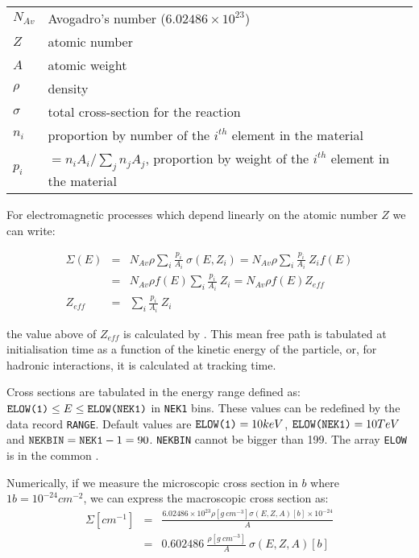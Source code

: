 \begin{tabular}[t]{ll}
$N_{Av}$         & Avogadro's number ($6.02486 \times 10^{23}$) \\
$Z$         & atomic number  \\
$A$         & atomic weight  \\
$\rho$    & density \\
$\sigma$  & total cross-section for the reaction \\
$n_i$   & \parbox[t]{14cm}{proportion by number of the $i^{th}$  
element in the material} \\
$p_i$ & \parbox[t]{14cm}{$=n_{i} A_{i}/ \sum_j n_jA_j$, proportion by 
weight of the $i^{th}$ element in the material}
\end{tabular}
 
For electromagnetic processes which depend linearly on the atomic number 
$Z$ we can write:

\begin{eqnarray*}
\Sigma(E)  & =  & N_{Av} \rho \sum_i \frac{p_i}{A_i}\: \sigma(E,Z_i) =
N_{Av} \rho \sum_i \frac{p_i}{A_i}\: Z_i f(E) \\
& = & N_{Av} \rho f(E) \sum_i \frac{p_i}{A_i}\: Z_i = N_{Av} \rho f(E) Z_{eff} \\
Z_{eff} & = & \sum_i \frac{p_i}{A_i}\: Z_i 
\end{eqnarray*}

the value above of $Z_{eff}$ is calculated by .
This mean free path is tabulated at initialisation time as a function
of the kinetic energy of the particle, or, for hadronic interactions,
it is calculated at tracking time.

Cross sections are tabulated in the energy range defined as: 
$\mbox{\tt ELOW(1)} \leq E \leq \mbox{\tt ELOW(NEK1)}$
in {\tt NEK1} bins. These values can be redefined by the data record
{\tt RANGE}. Default values are $\mbox{\tt ELOW(1)} = 10 keV$,
$\mbox{\tt ELOW(NEK1)} = 10 TeV$ and $\mbox{\tt NEKBIN} = 
\mbox{\tt NEK1}-1 = 90$. {\tt NEKBIN} cannot be bigger than 199.
The array {\tt ELOW} is in the common .

Numerically, if we measure the microscopic
cross section in $b$ where $1b=10^{-24}
cm^{-2}$, we can express the macroscopic cross section as:
\begin{eqnarray}
\Sigma [cm^{-1}]  & = & \frac{6.02486 \times 10^{23} \rho
[g \: cm^{-3}] \sigma (E,Z,A) [b] \times 10^{-24}}{A} \\
& = & 0.602486 \: \frac{\rho [g \: cm^{-3}]}{A} \: \sigma (E,Z,A) [b]
\end{eqnarray}

